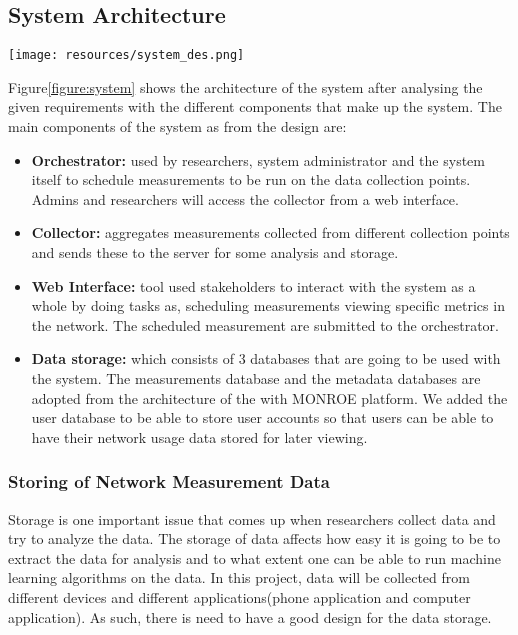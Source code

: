 \subsection{System Architecture}\label{subsec:system-architecture}
\begin{figure*}
    \begin{center}
        \texttt{[image: resources/system\_des.png]}
    \end{center}
    \caption{Showing the system overview, different components making the system and the communication directions between these components in the systems.}
    \label{figure:system}
\end{figure*}
Figure\ref{figure:system} shows the architecture of the system after analysing the given requirements with the different components that make up the system.
The main components of the system as from the design are:
\begin{itemize}
     \item \textbf{Orchestrator:} used by researchers, system administrator and the system itself to schedule measurements to be run on the data collection points.
     Admins and researchers will access the collector from a web interface.
    \item \textbf{Collector:} aggregates measurements collected from different collection points and sends these to the server for some analysis and storage.
    \item \textbf{Web Interface:} tool used stakeholders to interact with the system as a whole by doing tasks as, scheduling measurements viewing specific metrics in the network.
     The scheduled measurement are submitted to the orchestrator.
    \item \textbf{Data storage:} which consists of 3 databases that are going to be used with the system.
    The measurements database and the metadata databases are adopted from the architecture of the with MONROE platform\cite{7523537}.
    We added the user database to be able to store user accounts so that users can be able to have their network usage data stored for later viewing.
\end{itemize}
\subsubsection{Storing of Network Measurement Data}
Storage is one important issue that comes up when researchers collect data and try to analyze the data.
The storage of data affects how easy it is going to be to extract the data for analysis and to what extent one can be able to run machine learning algorithms on the data.
In this project, data will be collected from different devices and different applications(phone application and computer application).
As such, there is need to have a good design for the data storage.
